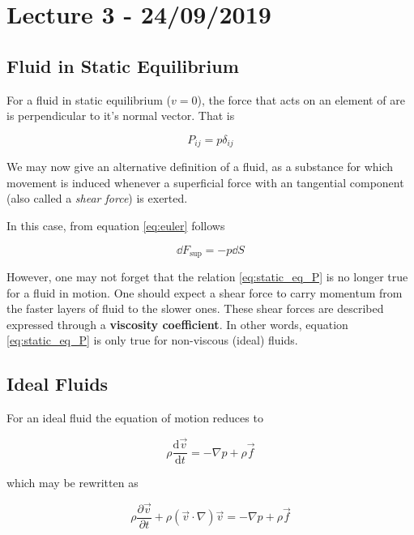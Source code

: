 \documentclass{article}
\begin{document}
\section{Lecture 3 - 24/09/2019}

\subsection{Fluid in Static Equilibrium}

For a fluid in static equilibrium ($v = 0$), the force that acts on an element
of are is perpendicular to it's normal vector. That is

\begin{equation}
  \label{eq:static_eq_P}
  P_{ij} = p \delta_{ij}
\end{equation}

We may now give an alternative definition of a fluid, as a substance for which
movement is induced whenever a superficial force with an tangential component
(also called a \textit{shear force}) is exerted.

In this case, from equation \ref{eq:euler} follows

\begin{equation*}
  \dd{F_{\text{sup}}} = -p \dd{S}
\end{equation*}

However, one may not forget that the relation \ref{eq:static_eq_P} is no longer
true for a fluid in motion. One should expect a shear force to carry momentum
from the faster layers of fluid to the slower ones. These shear forces are
described expressed through a \textbf{viscosity coefficient}. In other words,
equation \ref{eq:static_eq_P} is only true for non-viscous (ideal) fluids.

\subsection{Ideal Fluids}

For an ideal fluid the equation of motion reduces to

\begin{equation*}
  \rho \frac{\mathrm{d} \vec{v}}{\mathrm{d} t}=-\nabla p+\rho \vec{f}
\end{equation*}

which may be rewritten as

\begin{equation}
  \label{eq:euler_ideal_fluid}
  \rho \frac{\partial \vec{v}}{\partial t}+\rho(\vec{v} \cdot \nabla) \vec{v}=-\nabla p+\rho \vec{f}
\end{equation}
\end{document}
